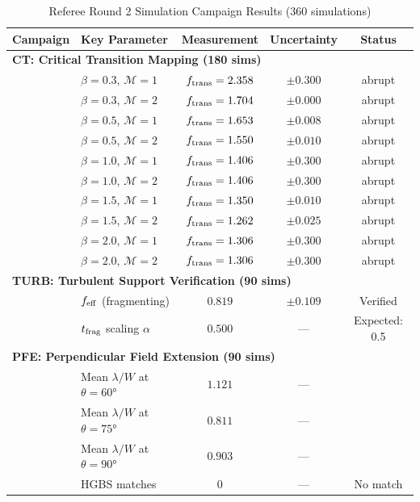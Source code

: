 \begin{table}
\centering
\caption{Referee Round 2 Simulation Campaign Results (360 simulations)}
\label{tab:referee_round2}
\begin{tabular}{llccc}
\hline
Campaign & Key Parameter & Measurement & Uncertainty & Status \\
\hline
\multicolumn{5}{l}{\textbf{CT: Critical Transition Mapping (180 sims)}} \\
  & $\beta=0.3$, $\mathcal{M}=1$ & $f_{\rm trans}=2.358$ & $\pm 0.300$ & abrupt \\
  & $\beta=0.3$, $\mathcal{M}=2$ & $f_{\rm trans}=1.704$ & $\pm 0.000$ & abrupt \\
  & $\beta=0.5$, $\mathcal{M}=1$ & $f_{\rm trans}=1.653$ & $\pm 0.008$ & abrupt \\
  & $\beta=0.5$, $\mathcal{M}=2$ & $f_{\rm trans}=1.550$ & $\pm 0.010$ & abrupt \\
  & $\beta=1.0$, $\mathcal{M}=1$ & $f_{\rm trans}=1.406$ & $\pm 0.300$ & abrupt \\
  & $\beta=1.0$, $\mathcal{M}=2$ & $f_{\rm trans}=1.406$ & $\pm 0.300$ & abrupt \\
  & $\beta=1.5$, $\mathcal{M}=1$ & $f_{\rm trans}=1.350$ & $\pm 0.010$ & abrupt \\
  & $\beta=1.5$, $\mathcal{M}=2$ & $f_{\rm trans}=1.262$ & $\pm 0.025$ & abrupt \\
  & $\beta=2.0$, $\mathcal{M}=1$ & $f_{\rm trans}=1.306$ & $\pm 0.300$ & abrupt \\
  & $\beta=2.0$, $\mathcal{M}=2$ & $f_{\rm trans}=1.306$ & $\pm 0.300$ & abrupt \\
\hline
\multicolumn{5}{l}{\textbf{TURB: Turbulent Support Verification (90 sims)}} \\
  & $f_{\rm eff}$ (fragmenting) & $0.819$ & $\pm 0.109$ & Verified \\
  & $t_{\rm frag}$ scaling $\alpha$ & $0.500$ & --- & Expected: 0.5 \\
\hline
\multicolumn{5}{l}{\textbf{PFE: Perpendicular Field Extension (90 sims)}} \\
  & Mean $\lambda/W$ at $\theta=60°$ & $1.121$ & --- & \\
  & Mean $\lambda/W$ at $\theta=75°$ & $0.811$ & --- & \\
  & Mean $\lambda/W$ at $\theta=90°$ & $0.903$ & --- & \\
  & HGBS matches & 0 & --- & No match \\
\hline
\end{tabular}
\end{table}
